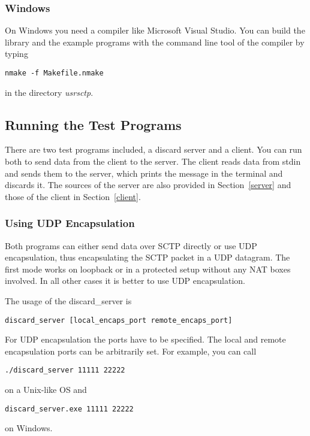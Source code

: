 \documentclass[a4paper]{article}
\begin{document}
\subsubsection{Windows}
On Windows you need a compiler like Microsoft Visual Studio. You can build the library and the
example programs with the command line tool of the compiler by typing
\begin{verbatim}
nmake -f Makefile.nmake
\end{verbatim}
in the directory \textit{usrsctp}.

\subsection{Running the Test Programs}
There are two test programs included, a discard server and a client. You can run both to send data from the
client to the server. The client reads data from stdin and sends them to the server, which prints the message
in the terminal and discards it. The sources of the server are also provided in Section~\ref{server} and those
of the client in Section~\ref{client}.

\subsubsection{Using UDP Encapsulation}
Both programs can either send data over SCTP directly or use UDP encapsulation, thus encapsulating the
SCTP packet in a UDP datagram. The first mode works on loopback or in a protected setup without any 
NAT boxes involved. In all other cases it is better to use UDP encapsulation.

The usage of the discard\_server is
\begin{verbatim}
discard_server [local_encaps_port remote_encaps_port]
\end{verbatim}
For UDP encapsulation the ports have to be specified. The local and remote encapsulation ports can be arbitrarily
set.
For example, you can call
\begin{verbatim}
./discard_server 11111 22222
\end{verbatim}
on a Unix-like OS and
\begin{verbatim}
discard_server.exe 11111 22222
\end{verbatim}
on Windows.
\end{document}
